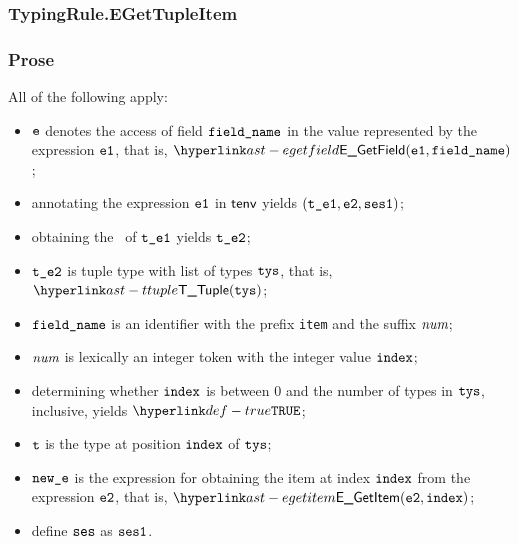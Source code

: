 \subsubsection{TypingRule.EGetTupleItem\label{sec:TypingRule.EGetTupleItem}}
\subsubsection{Prose}
All of the following apply:
\begin{itemize}
  \item $\texttt{e}$ denotes the access of field $\texttt{field\_name}$ in the value represented by the expression $\texttt{e1}$, that is, $\EGetField(\veone, \fieldname)$;
  \item annotating the expression $\texttt{e1}$ in $\textsf{tenv}$ yields $(\texttt{t\_e1}, \texttt{e2}, \texttt{ses1})$\ProseOrTypeError;
  \item obtaining the \underlyingtype\ of $\texttt{t\_e1}$ yields $\texttt{t\_e2}$\ProseOrTypeError;
  \item $\texttt{t\_e2}$ is tuple type with list of types $\texttt{tys}$, that is, $\TTuple(\tys)$;
  \item $\texttt{field\_name}$ is an identifier with the prefix \texttt{item} and the suffix $\textit{num}$;
  \item $\textit{num}$ is lexically an integer token with the integer value $\texttt{index}$;
  \item determining whether $\texttt{index}$ is between $0$ and the number of types in $\texttt{tys}$, inclusive, yields $\True$\ProseOrTypeError;
  \item $\texttt{t}$ is the type at position $\texttt{index}$ of $\texttt{tys}$;
  \item $\texttt{new\_e}$ is the expression for obtaining the item at index $\texttt{index}$ from the expression $\texttt{e2}$, that is, $\EGetItem(\vetwo, \vindex)$;
  \item define $\texttt{ses}$ as $\texttt{ses1}$.
\end{itemize}
